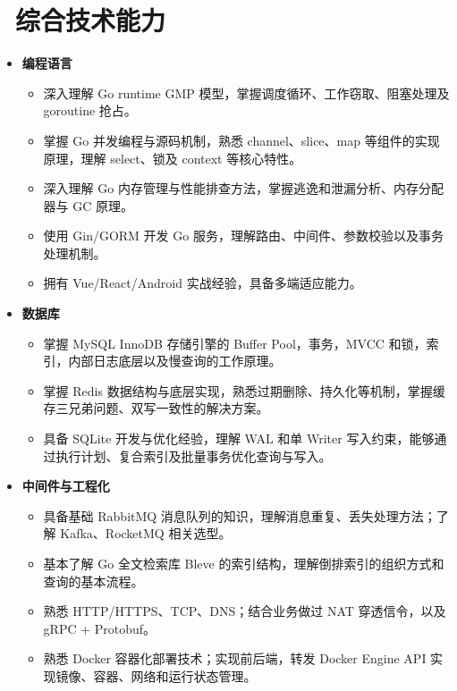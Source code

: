 \documentclass{styles/resume}
\begin{document}
\begin{minipage}{\textwidth}
\section[综合技术能力]{\faCogs\ 综合技术能力}
\begin{itemize}
    \item \textbf{编程语言}
    \begin{itemize}
        \item 深入理解 Go runtime GMP 模型，掌握调度循环、工作窃取、阻塞处理及 goroutine 抢占。
        \item 掌握 Go 并发编程与源码机制，熟悉 channel、slice、map 等组件的实现原理，理解 select、锁及 context 等核心特性。
        \item 深入理解 Go 内存管理与性能排查方法，掌握逃逸和泄漏分析、内存分配器与 GC 原理。
        \item 使用 Gin/GORM 开发 Go 服务，理解路由、中间件、参数校验以及事务处理机制。
        \item 拥有 Vue/React/Android 实战经验，具备多端适应能力。
    \end{itemize}

    \item \textbf{数据库}
    \begin{itemize}
        \item 掌握 MySQL InnoDB 存储引擎的 Buffer Pool，事务，MVCC 和锁，索引，内部日志底层以及慢查询的工作原理。
        \item 掌握 Redis 数据结构与底层实现，熟悉过期删除、持久化等机制，掌握缓存三兄弟问题、双写一致性的解决方案。
        \item 具备 SQLite 开发与优化经验，理解 WAL 和单 Writer 写入约束，能够通过执行计划、复合索引及批量事务优化查询与写入。
    \end{itemize}
    
    \item \textbf{中间件与工程化}
    \begin{itemize}
        \item 具备基础 RabbitMQ 消息队列的知识，理解消息重复、丢失处理方法；了解 Kafka、RocketMQ 相关选型。
        \item 基本了解 Go 全文检索库 Bleve 的索引结构，理解倒排索引的组织方式和查询的基本流程。
        \item 熟悉 HTTP/HTTPS、TCP、DNS；结合业务做过 NAT 穿透信令，以及 gRPC + Protobuf。
        \item 熟悉 Docker 容器化部署技术；实现前后端，转发 Docker Engine API 实现镜像、容器、网络和运行状态管理。
    \end{itemize}


\end{itemize}
\end{minipage}
\end{document}
